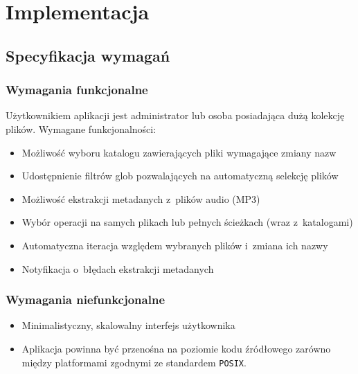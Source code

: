 \chapter{Implementacja}
\label{implementacja}

\section{Specyfikacja wymagań}
\label{specyfikacja-wymagan}

\subsection{Wymagania funkcjonalne}
Użytkownikiem aplikacji jest administrator lub osoba posiadająca dużą kolekcję plików.
Wymagane funkcjonalności:
\begin{itemize}
\item Możliwość wyboru katalogu zawierających pliki wymagające zmiany nazw
\item Udostępnienie filtrów glob pozwalających na automatyczną selekcję plików
\item Możliwość ekstrakcji metadanych z~plików audio (MP3)
\item Wybór operacji na samych plikach lub pełnych ścieżkach (wraz z~katalogami)
\item Automatyczna iteracja względem wybranych plików i~zmiana ich nazwy
\item Notyfikacja o~błędach ekstrakcji metadanych
\end{itemize}

\subsection{Wymagania niefunkcjonalne}
\begin{itemize}
\item Minimalistyczny, skalowalny interfejs użytkownika
\item Aplikacja powinna być przenośna na poziomie kodu źródłowego zarówno między platformami zgodnymi ze standardem \texttt{POSIX}.
\end{itemize}

